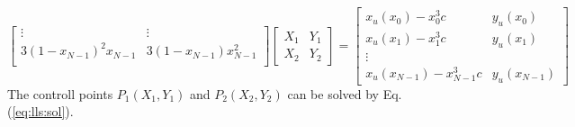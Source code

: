 \documentclass{turgon}
\begin{document}
\begin{flushleft}
\begin{equation}
\begin{bmatrix}
        \vdots & \vdots \\
        3(1 - x_{N-1})^2 x_{N-1} & 3(1 - x_{N-1}) x_{N-1}^2 \\
    \end{bmatrix}
    \begin{bmatrix}
        X_1 & Y_1 \\ 
        X_2 & Y_2
    \end{bmatrix}
    =
    \begin{bmatrix}
        x_u(x_0) - x_0^3 c & y_u(x_0) \\
        x_u(x_1) - x_1^3 c & y_u(x_1) \\
        \vdots \\
        x_u(x_{N-1}) - x_{N-1}^3 c & y_u(x_{N-1}) 
    \end{bmatrix}
\end{equation}
The controll points $P_1(X_1, Y_1)$ and $P_2(X_2, Y_2)$ can be solved by
Eq.(\ref{eq:lls:sol}). 

\end{flushleft}

\clearpage
{}


\end{document}
